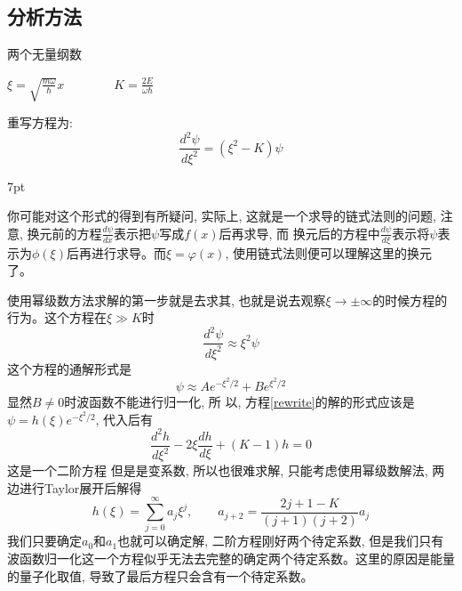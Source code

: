 \documentclass[a4paper,zihao=-4,linespread=1]{ctexrep}
\newenvironment{lequation}{\large\begin{equation}}{\end{equation}}
\newenvironment{thinknote}{%
\def\FrameCommand{%
\hspace{1pt}%
{\color{BurlyWood}\vrule width 2pt}%
{\color{formalshade}\vrule width 4pt}%
\colorbox{formalshade}%
}%
\MakeFramed{\advance\hsize-\width\FrameRestore}%
\noindent\hspace{-4.55pt}%
\begin{adjustwidth}{}{7pt}%
\vspace{2pt}\vspace{2pt}%
}
{%
\vspace{2pt}\end{adjustwidth}\endMakeFramed%
}
\begin{document}
    \subsection{分析方法}
    \begin{define}{两个无量纲数}
        \begin{center}
            \begin{math}
            \displaystyle
            \xi = \sqrt{\frac{m\omega}{\hbar}}x \qquad\qquad K=\frac{2E}{\omega\hbar}
            \end{math}
        \end{center}
    \end{define}
    重写方程为:
    \begin{lequation}
        \label{rewrite}
        \frac{d^2\psi}{d\xi^2}=(\xi^2-K)\psi
    \end{lequation}
    \begin{thinknote}
        你可能对这个形式的得到有所疑问, 实际上, 这就是一个求导的链式法则的问题, 注意, 换元前的方程$\frac{d\psi}{dx}$表示把$\psi$写成$f(x)$后再求导, 而
        换元后的方程中$\frac{d\psi}{d\xi}$表示将$\psi$表示为$\phi(\xi)$后再进行求导。而$\xi=\varphi(x)$, 使用链式法则便可以理解这里的换元了。
    \end{thinknote}
    使用幂级数方法求解的第一步就是去求其, 也就是说去观察$\xi \to \pm\infty$的时候方程的行为。这个方程在$\xi\gg K$时
    $$\frac{d^2\psi}{d\xi^2}\approx\xi^2\psi$$这个方程的通解形式是$$\psi\approx Ae^{-\xi^2/2}+Be^{\xi^2/2}$$显然$B\neq 0$时波函数不能进行归一化, 所
    以, 方程\ref{rewrite}的解的形式应该是$\psi = h(\xi)e^{-\xi^2/2}$, 代入后有$$\frac{d^2h}{d\xi^2}-2\xi\frac{dh}{d\xi}+(K-1)h=0$$这是一个二阶方程
    但是是变系数, 所以也很难求解, 只能考虑使用幂级数解法, 两边进行Taylor展开后解得$$h(\xi)=\sum_{j=0}^\infty a_j\xi^j,\qquad a_{j+2}=\frac{2j+1-K}{(j+1)(j+2)}a_j$$
    我们只要确定$a_0$和$a_1$也就可以确定解, 二阶方程刚好两个待定系数, 但是我们只有波函数归一化这一个方程似乎无法去完整的确定两个待定系数。这里的原因是能量
    的量子化取值, 导致了最后方程只会含有一个待定系数。
\end{document}
